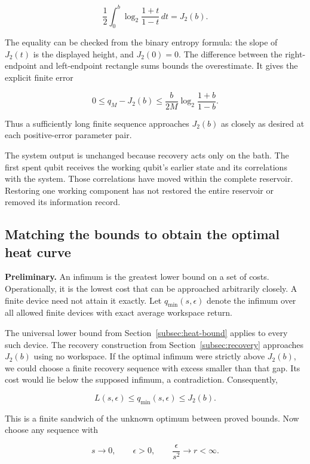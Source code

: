 \documentclass[11pt,letterpaper]{article}
\begin{document}
\[\frac{1}{2}\int_{0}^{b}\log_{2}\frac{1 + t}{1 - t}\, dt = J_{2}(b).\]

The equality can be checked from the binary entropy formula: the slope of \(J_{2}(t)\) is the displayed height, and \(J_{2}(0) = 0\). The difference between the right-endpoint and left-endpoint rectangle sums bounds the overestimate. It gives the explicit finite error

\[0 \leq q_{M} - J_{2}(b) \leq \frac{b}{2M}\log_{2}\frac{1 + b}{1 - b}.\]

Thus a sufficiently long finite sequence approaches \(J_{2}(b)\) as closely as desired at each positive-error parameter pair.

The system output is unchanged because recovery acts only on the bath. The first spent qubit receives the working qubit's earlier state and its correlations with the system. Those correlations have moved within the complete reservoir. Restoring one working component has not restored the entire reservoir or removed its information record.

\subsection{Matching the bounds to obtain the optimal heat curve}\label{subsec:optimal-crossover}

\textbf{Preliminary.} An infimum is the greatest lower bound on a set of costs. Operationally, it is the lowest cost that can be approached arbitrarily closely. A finite device need not attain it exactly. Let \(q_{\min}(s,\epsilon)\) denote the infimum over all allowed finite devices with exact average workspace return.

The universal lower bound from Section~\ref{subsec:heat-bound} applies to every such device. The recovery construction from Section~\ref{subsec:recovery} approaches \(J_{2}(b)\) using no workspace. If the optimal infimum were strictly above \(J_{2}(b)\), we could choose a finite recovery sequence with excess smaller than that gap. Its cost would lie below the supposed infimum, a contradiction. Consequently,

\[L(s,\epsilon) \leq q_{\min}(s,\epsilon) \leq J_{2}(b).\]

This is a finite sandwich of the unknown optimum between proved bounds. Now choose any sequence with

\[s \rightarrow 0,\quad\quad\epsilon > 0,\quad\quad\frac{\epsilon}{s^{2}} \rightarrow r < \infty.\]
\end{document}
